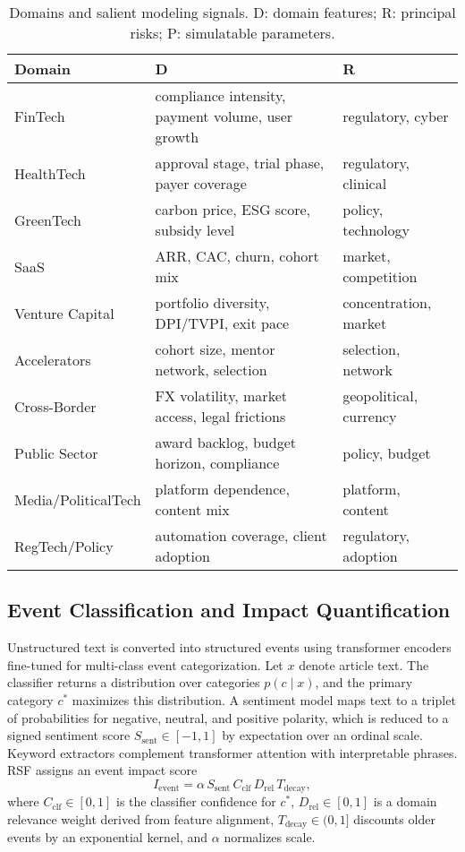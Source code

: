 \documentclass[conference]{IEEEtran}
\begin{document}
\begin{table}[H]
\centering
\caption{Domains and salient modeling signals. D: domain features; R: principal risks; P: simulatable parameters.}
\label{tab:domains}
\begin{tabular}{@{}p{2.8cm}p{3.1cm}p{2.8cm}@{}}
\toprule
Domain & D & R \\
\midrule
FinTech & compliance intensity, payment volume, user growth & regulatory, cyber \\
HealthTech & approval stage, trial phase, payer coverage & regulatory, clinical \\
GreenTech & carbon price, ESG score, subsidy level & policy, technology \\
SaaS & ARR, CAC, churn, cohort mix & market, competition \\
Venture Capital & portfolio diversity, DPI/TVPI, exit pace & concentration, market \\
Accelerators & cohort size, mentor network, selection & selection, network \\
Cross-Border & FX volatility, market access, legal frictions & geopolitical, currency \\
Public Sector & award backlog, budget horizon, compliance & policy, budget \\
Media/PoliticalTech & platform dependence, content mix & platform, content \\
RegTech/Policy & automation coverage, client adoption & regulatory, adoption \\
\bottomrule
\end{tabular}
\end{table}

\subsection{Event Classification and Impact Quantification}
Unstructured text is converted into structured events using transformer encoders fine-tuned for multi-class event categorization. Let $x$ denote article text. The classifier returns a distribution over categories $p(c\mid x)$, and the primary category $c^*$ maximizes this distribution. A sentiment model maps text to a triplet of probabilities for negative, neutral, and positive polarity, which is reduced to a signed sentiment score $S_{\mathrm{sent}}\in[-1,1]$ by expectation over an ordinal scale. Keyword extractors complement transformer attention with interpretable phrases. RSF assigns an event impact score
\begin{equation}
I_{\mathrm{event}} = \alpha\,S_{\mathrm{sent}}\,C_{\mathrm{clf}}\,D_{\mathrm{rel}}\,T_{\mathrm{decay}},
\end{equation}
where $C_{\mathrm{clf}}\in[0,1]$ is the classifier confidence for $c^*$, $D_{\mathrm{rel}}\in[0,1]$ is a domain relevance weight derived from feature alignment, $T_{\mathrm{decay}}\in(0,1]$ discounts older events by an exponential kernel, and $\alpha$ normalizes scale.
\end{document}
